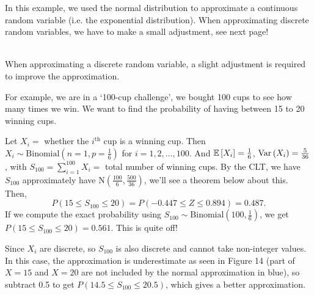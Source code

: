 \begin{note}
    In this example, we used the normal distribution to approximate a continuous random variable (i.e. the exponential distribution). When approximating discrete random variables, we have to make a small adjustment, see next page!
\end{note}


\pagebreak


\begin{remark}
    \phantom{}\\
    When approximating a discrete random variable, a slight adjustment is required to improve the approximation. 

For example, we are in a `100-cup challenge', we bought 100 cups to see how many times we win. We want to find the probability of having between 15 to 20 winning cups. 

Let $X_i = $ whether the $i^{\text{th}}$ cup is a winning cup. Then $X_i \sim \text{Binomial}(n=1,p=\frac{1}{6})$ for $i = 1,2,\ldots,100$. And $\mathbb{E}\left[{X_i}\right] = \frac{1}{6}$, $\operatorname{Var}\left({X_i}\right) = \frac{5}{36}$, with $S_{100} = \displaystyle \sum_{i=1}^{100} X_i = $ total number of winning cups. By the CLT, we have $S_{100}$ approximately have $\text{N}(\frac{100}{6}, \frac{500}{36})$, we'll see a theorem below about this. Then,
\[
    P(15 \leq S_{100} \leq 20) = P(-0.447 \leq Z \leq 0.894) = 0.487.
\]
If we compute the exact probability using $S_{100} \sim \text{Binomial}(100, \frac{1}{6})$, we get $P(15 \leq S_{100} \leq 20) = 0.561$. This is quite off!

Since $X_i$ are discrete, so $S_{100}$ is also discrete and cannot take non-integer values. In this case, the approximation is underestimate as seen in Figure 14 (part of $X=15$ and $X = 20$ are not included by the normal approximation in {\color{blue} blue}), so subtract 0.5 to get $P(14.5 \leq S_{100} \leq 20.5)$, which gives a better approximation.


\end{remark}
